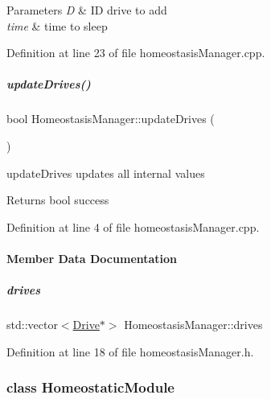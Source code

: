 \begin{DoxyParams}{Parameters}
{\em D} & ID drive to add \\
\hline
{\em time} & time to sleep \\
\hline
\end{DoxyParams}


Definition at line 23 of file homeostasis\+Manager.\+cpp.

\mbox{\label{group__homeostasis_ae904ca4369d3816c2cbccb7a36b4b54f}} 
\subparagraph{\texorpdfstring{update\+Drives()}{updateDrives()}}
{\footnotesize\ttfamily bool Homeostasis\+Manager\+::update\+Drives (\begin{DoxyParamCaption}{ }\end{DoxyParamCaption})}



update\+Drives updates all internal values 

\begin{DoxyReturn}{Returns}
bool success 
\end{DoxyReturn}


Definition at line 4 of file homeostasis\+Manager.\+cpp.



\paragraph{Member Data Documentation}
\mbox{\label{group__homeostasis_ab1634f96f9e9104efcbe470c75a7f2f0}} 
\subparagraph{\texorpdfstring{drives}{drives}}
{\footnotesize\ttfamily std\+::vector$<$\hyperlink{group__homeostasis_classDrive}{Drive}$\ast$$>$ Homeostasis\+Manager\+::drives}



Definition at line 18 of file homeostasis\+Manager.\+h.

\label{classHomeostaticModule}
\subsubsection{class Homeostatic\+Module}


